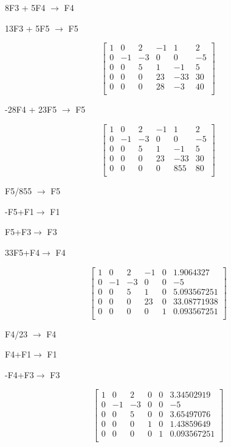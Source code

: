 \documentclass[12pt]{article}
\begin{document}
8F3 + 5F4 $\longrightarrow $ F4

13F3 + 5F5 $\longrightarrow $ F5

\[
\begin{bmatrix}
1 & 0 & 2 & -1 & 1 & 2\\ 
0 & -1 & -3 & 0 & 0 & -5\\
0 & 0 & 5 & 1 & -1 & 5\\   
0 & 0 & 0 & 23 & -33 & 30\\
0 & 0 & 0 & 28 & -3 & 40\\
\end{bmatrix}
\]

-28F4 + 23F5 $\longrightarrow $ F5

\[
\begin{bmatrix}
1 & 0 & 2 & -1 & 1 & 2\\ 
0 & -1 & -3 & 0 & 0 & -5\\
0 & 0 & 5 & 1 & -1 & 5\\   
0 & 0 & 0 & 23 & -33 & 30\\
0 & 0 & 0 & 0 & 855 & 80\\
\end{bmatrix}
\]

F5/855 $\longrightarrow $ F5

-F5+F1$\longrightarrow $ F1

F5+F3$\longrightarrow $ F3

33F5+F4$\longrightarrow $ F4

\[
\begin{bmatrix}
1 & 0 & 2 & -1 & 0 & 1.9064327\\ 
0 & -1 & -3 & 0 & 0 & -5\\
0 & 0 & 5 & 1 & 0 & 5.093567251\\   
0 & 0 & 0 & 23 & 0 & 33.08771938\\
0 & 0 & 0 & 0 & 1 & 0.093567251\\
\end{bmatrix}
\]

F4/23 $\longrightarrow $ F4

F4+F1$\longrightarrow $ F1

-F4+F3$\longrightarrow $ F3

\[
\begin{bmatrix}
1 & 0 & 2 & 0 & 0 & 3.34502919\\ 
0 & -1 & -3 & 0 & 0 & -5\\
0 & 0 & 5 & 0 & 0 & 3.65497076\\   
0 & 0 & 0 & 1 & 0 & 1.43859649\\
0 & 0 & 0 & 0 & 1 & 0.093567251\\
\end{bmatrix}
\]
\end{document}
